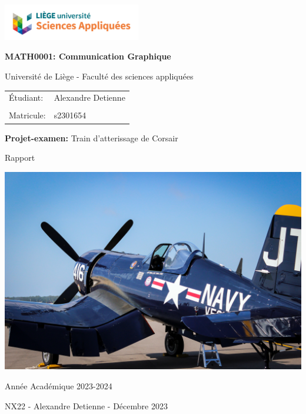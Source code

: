 \documentclass{article}
\begin{document}
\begin{titlepage}
    \begin{flushleft}
        \includegraphics[width=6cm]{pics/uliege_logo.png}
    \end{flushleft}
    \begin{center}
        \vspace{2cm}

        \LARGE{\textbf{MATH0001: Communication Graphique}}

        \vspace{0.5cm}

        \large{Université de Liège - Faculté des sciences appliquées}

        \vspace{0.5cm}

        \begin{tabular}{l l}
            Étudiant: & Alexandre Detienne\\
            \\
            Matricule: & s2301654\\
        \end{tabular}

        \vspace{2cm}

        \LARGE{\textbf{Projet-examen:} Train d'atterissage de Corsair}

        \vspace{1cm}

        Rapport
    
        \vspace{1.5cm}

        \includegraphics[width = 0.8\linewidth]{pics/corsair_image_frontpage.jpg}

        \vspace{1cm}
    \end{center}

    \begin{flushleft}
        Année Académique 2023-2024

        NX22 - Alexandre Detienne - Décembre 2023
    \end{flushleft}
\end{titlepage}
\end{document}
